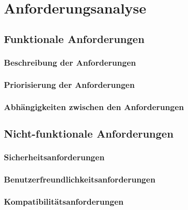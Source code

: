 \section{Anforderungsanalyse}\label{sec:anforderungen}
   \subsection{Funktionale Anforderungen}\label{subsec:funktionale-anforderungen}
      \subsubsection{Beschreibung der Anforderungen}\label{subsubsec:beschreibung}
      \subsubsection{Priorisierung der Anforderungen}\label{subsubsec:priorisierung}
      \subsubsection{Abhängigkeiten zwischen den Anforderungen}\label{subsubsec:abhaengigkeiten}
   \subsection{Nicht-funktionale Anforderungen}\label{subsec:nicht-funktionale-anforderungen}
      \subsubsection{Sicherheitsanforderungen}\label{subsubsec:sicherheit}
      \subsubsection{Benutzerfreundlichkeitsanforderungen}\label{subsubsec:benutzerfreundlichkeit}
      \subsubsection{Kompatibilitätsanforderungen}\label{subsubsec:kompatibilitaet}